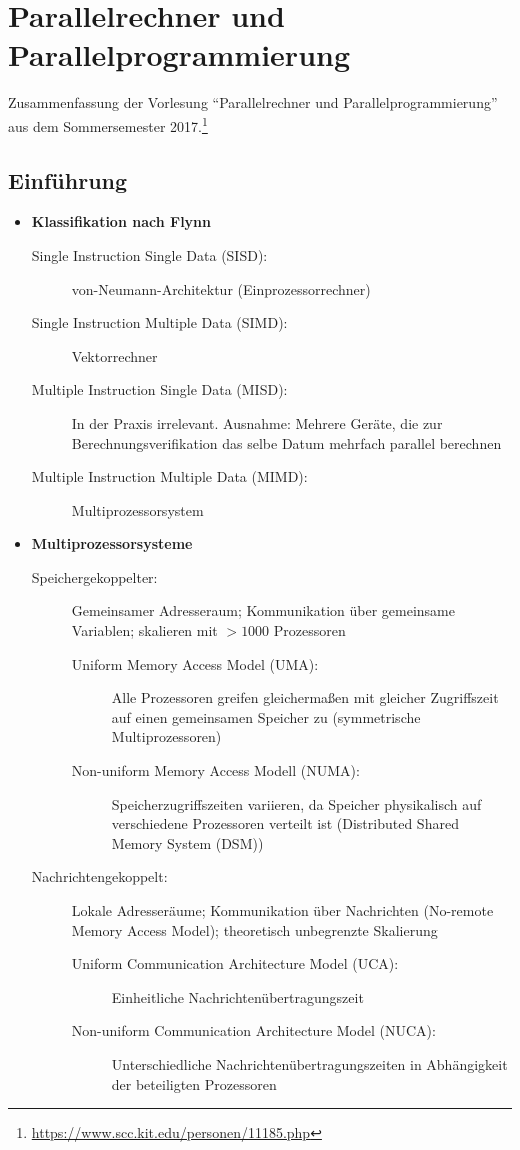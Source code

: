 \chapter{Parallelrechner und Parallelprogrammierung}

Zusammenfassung der Vorlesung "`Parallelrechner und Parallelprogrammierung"' aus dem Sommersemester 2017.\footnote{\url{https://www.scc.kit.edu/personen/11185.php}}



\section{Einführung}

\begin{itemize}
	\item \textbf{Klassifikation nach Flynn}
	\begin{description}
		\item[Single Instruction Single Data (SISD):] von-Neumann-Architektur (Einprozessorrechner)
		\item[Single Instruction Multiple Data (SIMD):] Vektorrechner
		\item[Multiple Instruction Single Data (MISD):] In der Praxis irrelevant. Ausnahme: Mehrere Geräte, die zur Berechnungsverifikation das selbe Datum mehrfach parallel berechnen
		\item[Multiple Instruction Multiple Data (MIMD):] Multiprozessorsystem
	\end{description}
	\item \textbf{Multiprozessorsysteme}
	\begin{description}
		\item[Speichergekoppelter:] Gemeinsamer Adresseraum; Kommunikation über gemeinsame Variablen; skalieren mit \(>1000\) Prozessoren
		\begin{description}
			\item[Uniform Memory Access Model (UMA):] Alle Prozessoren greifen gleichermaßen mit gleicher Zugriffszeit auf einen gemeinsamen Speicher zu (symmetrische Multiprozessoren)
			\item[Non-uniform Memory Access Modell (NUMA):] Speicherzugriffszeiten variieren, da Speicher physikalisch auf verschiedene Prozessoren verteilt ist (Distributed Shared Memory System (DSM))
		\end{description}
		\item[Nachrichtengekoppelt:] Lokale Adresseräume; Kommunikation über Nachrichten (No-remote Memory Access Model); theoretisch unbegrenzte Skalierung
		\begin{description}
			\item[Uniform Communication Architecture Model (UCA):] Einheitliche Nachrichtenübertragungszeit
			\item[Non-uniform Communication Architecture Model (NUCA):] Unterschiedliche Nachrichtenübertragungszeiten in Abhängigkeit der beteiligten Prozessoren
		\end{description}
	\end{description}
\end{itemize}



